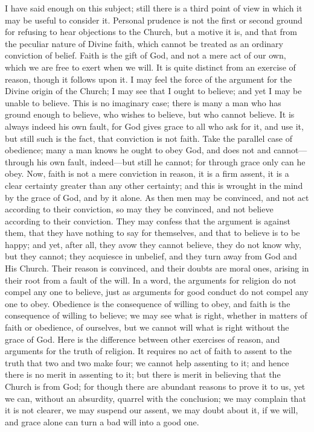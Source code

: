 I have said enough on this subject; still there is a third point of
view in which it may be useful to consider it. Personal prudence is
not the first or second ground for refusing to hear objections to the
Church, but a motive it is, and that from the peculiar nature of
Divine faith, which cannot be treated as an ordinary conviction of
belief. Faith is the gift of God, and not a mere act of our own, which
we are free to exert when we will. It is quite distinct from an
exercise of reason, though it follows upon it. I may feel the force of
the argument for the Divine origin of the Church; I may see that I
ought to believe; and yet I may be unable to believe. This is no
imaginary case; there is many a man who has ground enough to believe,
who wishes to believe, but who cannot believe. It is always indeed his
own fault, for God gives grace to all who ask for it, and use it, but
still such is the fact, that conviction is not faith. Take the
parallel case of obedience; many a man knows he ought to obey God, and
does not and cannot—through his own fault, indeed—but still he
cannot; for through grace only can he obey. Now, faith is not a mere
conviction in reason, it is a firm assent, it is a clear certainty
greater than any other certainty; and this is wrought in the mind by
the grace of God, and by it alone. As then men may be convinced, and
not act according to their conviction, so may they be convinced, and
not believe according to their conviction. They may confess that the
argument is against them, that they have nothing to say for
themselves, and that to believe is to be happy; and yet, after all,
they avow they cannot believe, they do not know why, but they cannot;
they acquiesce in unbelief, and they turn away from God and His
Church. Their reason is convinced, and their doubts are moral ones,
arising in their root from a fault of the will. In a word, the
arguments for religion do not compel any one to believe, just as
arguments for good conduct do not compel any one to obey. Obedience is
the consequence of willing to obey, and faith is the consequence of
willing to believe; we may see what is right, whether in matters of
faith or obedience, of ourselves, but we cannot will what is right
without the grace of God. Here is the difference between other
exercises of reason, and arguments for the truth of religion. It
requires no act of faith to assent to the truth that two and two make
four; we cannot help assenting to it; and hence there is no merit in
assenting to it; but there is merit in believing that the Church is
from God; for though there are abundant reasons to prove it to us, yet
we can, without an absurdity, quarrel with the conclusion; we may
complain that it is not clearer, we may suspend our assent, we may
doubt about it, if we will, and grace alone can turn a bad will into a
good one.

